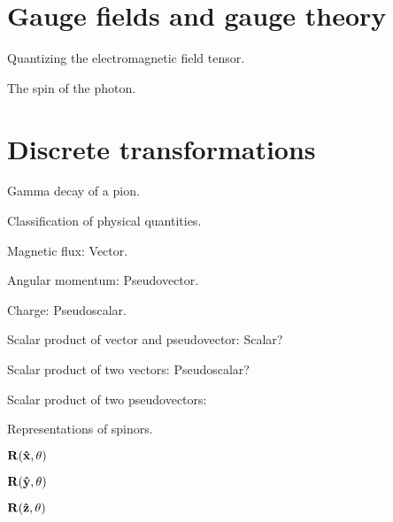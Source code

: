 \documentclass{report}
\begin{document}
\chapter{Gauge fields and gauge theory}

\begin{subquests}
	\item Quantizing the electromagnetic field tensor.

	\item The spin of the photon.
	\begin{subquests}
		\item

		\item
	\end{subquests}
\end{subquests}

\chapter{Discrete transformations}

\begin{subquests}
	\item Gamma decay of a pion.

	\item Classification of physical quantities.
	\begin{subquests}
		\item Magnetic flux: Vector.

		\item Angular momentum: Pseudovector.

		\item Charge: Pseudoscalar.

		\item Scalar product of vector and pseudovector: Scalar?

		\item Scalar product of two vectors: Pseudoscalar?

		\item Scalar product of two pseudovectors: 
	\end{subquests}

	\item Representations of spinors.
	\begin{subquests}
		\item $\mathbf R(\vb{\hat x}, \theta)$

		\item $\mathbf R(\vb{\hat y}, \theta)$

		\item $\mathbf R(\vb{\hat z}, \theta)$
	\end{subquests}
\end{subquests}
\end{document}
